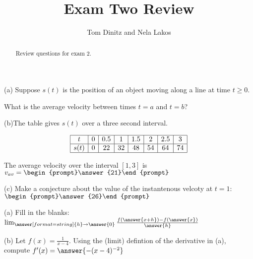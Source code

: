 \documentclass{ximera}
\author{Tom Dinitz and Nela Lakos}
\title{Exam Two Review}
\begin{document}
\begin{abstract}
Review questions for exam 2.
\end{abstract}
\maketitle

\begin{exercise}
(a) Suppose $s(t)$ is the position of an object moving along a line at time $t\geq 0$. 

What is the average velocity between times $t=a$ and $t=b$?
\begin{prompt}
\begin{multipleChoice}
\end{multipleChoice}
\end{prompt}

(b)The table gives $s(t)$ over a three second interval.

\[
\begin{array}{|c|c|c|c|c|c|c|c|}
\hline
t& 0& 0.5& 1& 1.5& 2& 2.5& 3\\ \hline
s(t)& 0 & 22 & 32 & 48 & 54 & 64 & 74 \\ \hline
\end{array}
\]

The average velocity over the interval $[1,3]$ is $v_{av}=\begin{prompt}\answer{21}\end{prompt}$

(c) Make a conjecture about the value of the instantenous velcoty at $t=1$: $\begin{prompt}\answer{26}\end{prompt}$
\end{exercise}

\begin{exercise}
(a) Fill in the blanks: $\lim_{\answer[format=string]{h}\to\answer{0}}\frac{f(\answer{x+h})-f(\answer{x})}{\answer{h}}$

(b) Let $f(x)=\frac{1}{x-4}$. Using the (limit) defintion of the derivative in (a), compute $f'(x)=\answer{-(x-4)^{-2}}$
\end{exercise}
\end{document}
